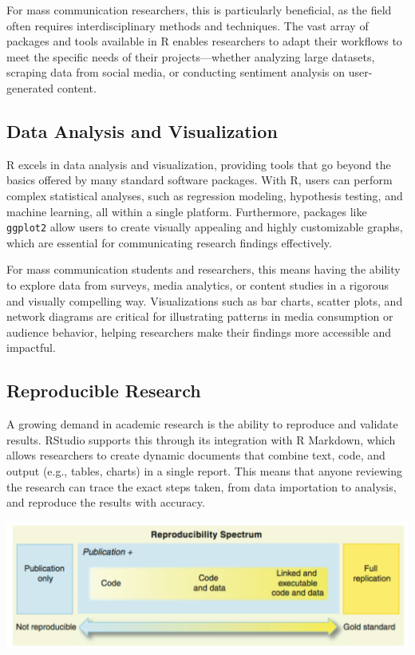 \documentclass[
]{book}
\begin{document}
For mass communication researchers, this is particularly beneficial, as the field often requires interdisciplinary methods and techniques. The vast array of packages and tools available in R enables researchers to adapt their workflows to meet the specific needs of their projects---whether analyzing large datasets, scraping data from social media, or conducting sentiment analysis on user-generated content.

\subsection*{Data Analysis and Visualization}\label{data-analysis-and-visualization}

R excels in data analysis and visualization, providing tools that go beyond the basics offered by many standard software packages. With R, users can perform complex statistical analyses, such as regression modeling, hypothesis testing, and machine learning, all within a single platform. Furthermore, packages like \texttt{ggplot2} allow users to create visually appealing and highly customizable graphs, which are essential for communicating research findings effectively.

For mass communication students and researchers, this means having the ability to explore data from surveys, media analytics, or content studies in a rigorous and visually compelling way. Visualizations such as bar charts, scatter plots, and network diagrams are critical for illustrating patterns in media consumption or audience behavior, helping researchers make their findings more accessible and impactful.

\subsection*{Reproducible Research}\label{reproducible-research}

A growing demand in academic research is the ability to reproduce and validate results. RStudio supports this through its integration with R Markdown, which allows researchers to create dynamic documents that combine text, code, and output (e.g., tables, charts) in a single report. This means that anyone reviewing the research can trace the exact steps taken, from data importation to analysis, and reproduce the results with accuracy.

\href{https://geohackweek.github.io/reproducible-research/01-reproducible/}{\includegraphics[width=1\linewidth,height=\textheight,keepaspectratio]{images/reproducibility.png}}
\end{document}
